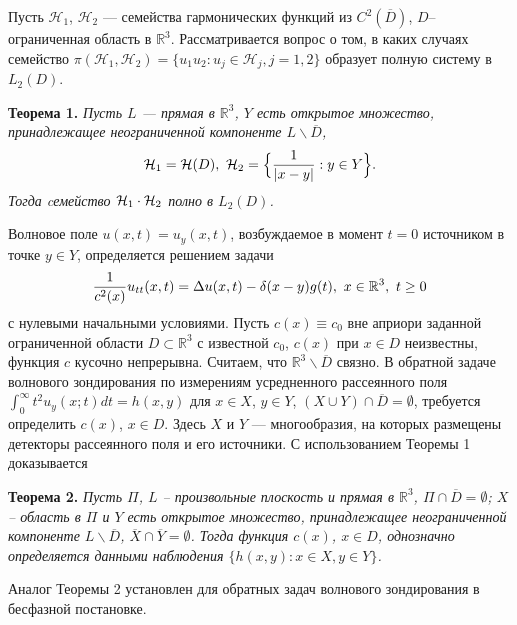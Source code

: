 \documentclass{vzmsthesis}
\begin{document}

\vzmscaption
Пусть ${\mathcal H}_1$, ${\mathcal H}_2$ --- семейства гармонических функций из $C^2({\overline D})$, $D$--ограниченная область в $\mathbb{R}^3$.
Рассматривается вопрос о том, в каких случаях семейство $\pi({\mathcal H}_1,{\mathcal H}_2)=\{ u_1 u_2: u_j \in {\mathcal H}_j, j=1,2 \}$
образует полную систему в $L_2(D)$.

{\bf Теорема 1.} {\it Пусть $L$ --- прямая в $\mathbb{R}^3$, $Y$ есть открытое множество, принадлежащее неограниченной компоненте $L\backslash {\overline D}$,
$$
{\cal H}_1={\cal H}(D), \,\, {\cal H}_2=\Bigl\{ {{1}\over{\vert x-y\vert}}: y\in Y \Bigr\}.
$$
Тогда cемейство ${\cal H}_1 \cdot {\cal H}_2$ полно в $L_{2}(D)$.
}


Волновое поле $u(x,t)=u_y(x,t)$, возбуждаемое в момент $t=0$ источником в точке $y\in Y$, определяется решением задачи
$$
{{1}\over{c^2(x)}} u_{tt}(x,t)=\Delta
u(x,t)-\delta(x-y) g(t), \,\, x\in \mathbb{R}^3, \,\, t\geq 0
$$
с нулевыми начальными условиями. Пусть $c(x)\equiv c_0$ вне априори заданной ограниченной области $D \subset \mathbb{R}^3$ с известной $c_0$, $c(x)$ при $x\in D$ неизвестны, функция $c$ кусочно непрерывна. Считаем, что ${\mathbb R}^3 \backslash {\overline D}$ связно.
В обратной задаче волнового зондирования по измерениям усредненного рассеянного поля $\int_0^{\infty} t^2 u_y(x;t)dt=h(x,y)$ для $x\in X$, $y\in Y$, $(X\cup Y)\cap {\overline D}=\emptyset$, требуется определить $c(x)$, $x\in D$. Здесь $X$ и $Y$ --- многообразия, на которых размещены детекторы рассеянного поля и его источники. С использованием Теоремы 1 доказывается

{\bf Теорема 2.} {\it Пусть $\Pi$, ${L}$ -- произвольные плоскость и прямая в $\mathbb{R}^3$, $\Pi\cap {\overline D}=\emptyset$; $X$ -- область в $\Pi$ и $Y$ есть открытое множество, принадлежащее неограниченной компоненте $L\backslash {\overline D}$, ${\overline X} \cap {\overline Y}=\emptyset$. Тогда функция $c(x)$, $x\in D$, однозначно определяется данными наблюдения $\{ h(x,y): x\in X, y\in Y \}$.
}

Аналог Теоремы 2 установлен для обратных задач волнового зондирования в бесфазной постановке.
\end{document}
